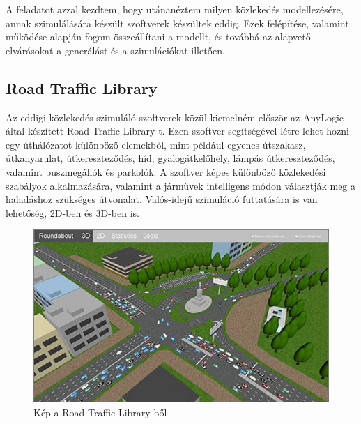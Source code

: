 ﻿

A feladatot azzal kezdtem, hogy utánanéztem milyen közlekedés modellezésére, annak szimulálására készült szoftverek készültek eddig. Ezek felépítése, valamint működése alapján fogom összeállítani a modellt, és továbbá az alapvető elvárásokat a generálást és a szimulációkat illetően.\cite{reviewoftrafficsim}
\subsection{Road Traffic Library}


Az eddigi közlekedés-szimuláló szoftverek közül kiemelném először az AnyLogic által készített Road Traffic Library-t\cite{roadtrafficsim}. Ezen szoftver segítségével létre lehet hozni egy úthálózatot
különböző elemekből, mint például egyenes útszakasz, útkanyarulat, útkereszteződés, híd, gyalogátkelőhely, lámpás útkereszteződés, valamint buszmegállók és parkolók.
A szoftver képes különböző közlekedési szabályok alkalmazására, valamint a járművek intelligens módon választják meg a haladáshoz szükséges útvonalat.
Valós-idejű szimuláció futtatására is van lehetőség, 2D-ben és 3D-ben is. 
\begin{figure}[H]
\includegraphics[width=\linewidth]{RTL.png}
\caption{Kép a Road Traffic Library-ből\cite{anylogicpic}}
\label{fig:RTL}
\end{figure}

